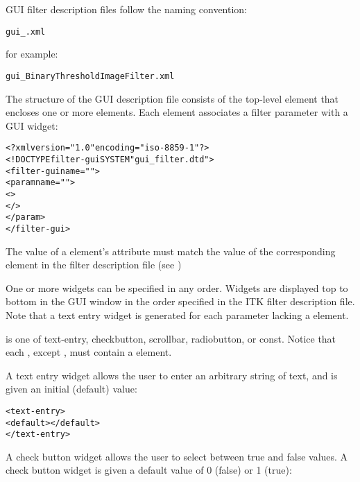 \sr{} GUI filter description files follow the naming
convention:

\begin{alltt}
  gui\_.xml
\end{alltt}

for example:

\begin{alltt}
  gui\_BinaryThresholdImageFilter.xml
\end{alltt}

The structure of the GUI description file consists of the
top-level element  that encloses one or more
 elements.  Each  element
associates a filter parameter with a GUI widget:

\begin{alltt}
  <?xml version="1.0"  encoding="iso-8859-1"?>
  <!DOCTYPE filter-gui SYSTEM "gui_filter.dtd">
  <filter-gui name="">
    <param name="">
      <>
      \velide
      </>
      \velide
    </param>
    \velide  
  </filter-gui>
\end{alltt}

The value of a  element's 
attribute must match the value of the corresponding
 element in the filter description file (see
)

One or more widgets can be specified in any order. Widgets are
displayed top to bottom in the GUI window in the order specified in
the ITK filter description file. Note that a text entry widget is
generated for each parameter lacking a  element.

 is one of text-entry, checkbutton,
scrollbar, radiobutton, or const. Notice that each
, except , must
contain a  element.

A text entry widget allows the user to enter an arbitrary string of text,
and is given an initial (default) value:

\begin{alltt}
  <text-entry>
    <default></default>
  </text-entry>
\end{alltt}

A check button widget allows the user to select between true and false
values.  A check button widget is given a default value of 0 (false)
or 1 (true):


